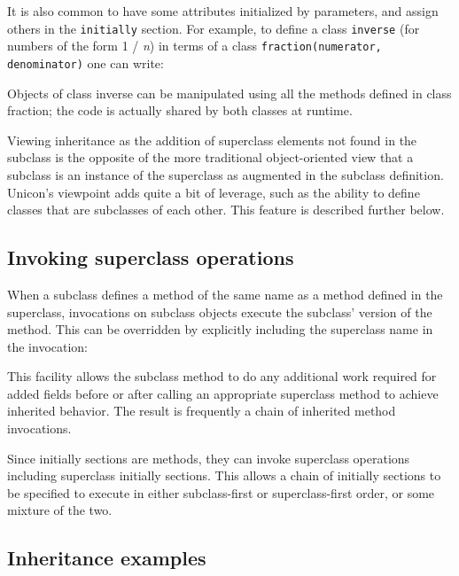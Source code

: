\noindent
It is also common to have some attributes initialized by parameters, and
assign others in the \texttt{initially} section. For example, to define a
class \texttt{inverse} (for numbers of the form 1 / \textit{n}) in terms
of a class \texttt{fraction(numerator, denominator)} one can write: 


Objects of class inverse can be manipulated using all the methods
defined in class fraction; the code is actually shared by both classes
at runtime. 

Viewing inheritance as the addition of superclass elements not found in
the subclass is the opposite of the more traditional object-oriented
view that a subclass is an instance of the
superclass as augmented in the subclass definition.
Unicon's viewpoint adds quite a bit of leverage, such
as the ability to define classes that are subclasses of each other.
This feature is described further below. 

\subsection{Invoking superclass operations}

When a subclass defines a
method of the same name as a method defined in the superclass,
invocations on subclass objects execute the
subclass' version of the
method. This can be overridden by explicitly
including the superclass name in the invocation:


This facility allows the subclass method to do any additional work
required for added fields before or after calling an appropriate
superclass method to achieve inherited behavior. The result is
frequently a chain of inherited method invocations. 

Since initially sections are methods, they can invoke superclass
operations including superclass initially sections. This allows a chain
of initially sections to be specified to execute in either
subclass-first or superclass-first order, or some mixture of the two. 

\subsection{Inheritance examples}

